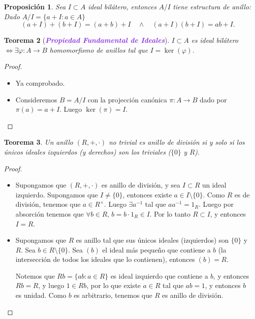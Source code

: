 \documentclass{article}
\newtheorem{theorem}{Teorema}[subsection]
\newtheorem{proposition}[theorem]{Proposición}
\theoremstyle{definition}
\theoremstyle{remark}
\numberwithin{equation}{section}
\newcommand{\vphi}{\varphi}
\renewcommand{\c}{\cdot}
\newcommand{\wea}[1]{\textcolor{BlueViolet}{\textbf{\emph{#1}}}}
\begin{document}
\begin{proposition}
  Sea $I \subset A$ ideal bilátero, entonces $A/I$ tiene estructura de anillo: Dado $A/I = \{a + I \colon a \in A\}$ 
  \[ (a+I) + (b+I) = (a+b) + I \quad\land\quad (a+I)(b+I) = ab + I. \]
\end{proposition}

\begin{theorem}
  [\wea{Propiedad Fundamental de Ideales}]
  $I \subset A$ es ideal bilátero $\iff \exists \vphi \colon A \to B$ homomorfismo de anillos tal que $I = \ker(\vphi)$.
\end{theorem}
\begin{proof}
  \ \begin{itemize}
    \item \boxed{\impliedby} Ya comprobado.
    \item \boxed{\implies} Consideremos $B = A/I$ con la projección canónica $\pi \colon A \to B$ dado por $\pi(a) = a + I$. Luego $\ker(\pi) = I$.
  \end{itemize}
\end{proof}

\begin{theorem}
  Un anillo $(R,+,\c)$ no trivial es anillo de división si y solo si los únicos ideales izquierdos (y derechos) son los triviales ($\{0\}$ y $R$).
\end{theorem}
\begin{proof}
  \ \begin{itemize}
    \item \boxed{\implies} Supongamos que $(R,+,\c)$ es anillo de división, y sea $I \subset R$ un ideal izquierdo. Supongamos que $I \neq \{0\}$, entonces existe $a \in I \setminus \{0\}$. Como $R$ es de división, tenemos que $a \in R^\times$. Luego $\exists a^{-1}$ tal que $aa^{-1} = 1_R$. Luego por absorción tenemos que $\forall b \in R$, $b = b \c 1_R \in I$. Por lo tanto $R \subset I$, y entonces $I = R$.
    \item \boxed{\impliedby} Supongamos que $R$ es anillo tal que sus únicos ideales (izquierdos) son $\{0\}$ y $R$. Sea $b \in R \setminus \{0\}$. Sea $(b)$ el ideal más pequeño que contiene a $b$ (la intersección de todos los ideales que lo contienen), entonces $(b) = R$.
    
    Notemos que $Rb = \{ab \colon a \in R\}$ es ideal izquierdo que contiene a $b$, y entonces $Rb = R$, y luego $1 \in Rb$, por lo que existe $a \in R$ tal que $ab = 1$, y entonces $b$ es unidad. Como $b$ es arbitrario, tenemos que $R$ es anillo de división.
  \end{itemize}
\end{proof}
\end{document}

